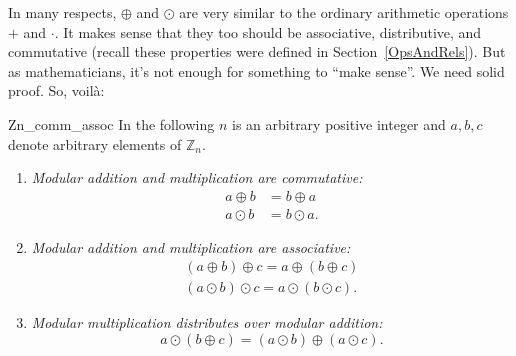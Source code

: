 In many respects, $\oplus$ and $\odot$ are very similar to the ordinary arithmetic operations $+$ and $\cdot$. It makes sense that they too should be associative, distributive, and commutative  (recall these properties were defined   in Section~\ref{OpsAndRels}). But as mathematicians, it's not enough for something to ``make sense''. We need solid proof. So, voil\`a:

\begin{prop}{Zn_comm_assoc}
In the following $n$ is an arbitrary positive integer and $a, b, c$ denote arbitrary elements of ${\mathbb Z}_n$.
\begin{enumerate}
 
\item \label{comm} \it %
Modular addition and multiplication are commutative:  
\begin{align*}
a \oplus b  & =  b \oplus a  \\
a \odot b   & =  b \odot a .
\end{align*}
 
\item \label{assoc} \it %
Modular addition and multiplication are associative: 
\begin{align*}
(a \oplus b) \oplus c  =  a \oplus (b \oplus c) \\
(a \odot b) \odot c    =  a \odot (b \odot c).
\end{align*}
 
\item \label{distrib} \it %
Modular multiplication distributes over modular addition: 
\[
a \odot (b \oplus c)  = (a \odot b)\oplus (a \odot c).
\]
\end{enumerate}
\end{prop}

